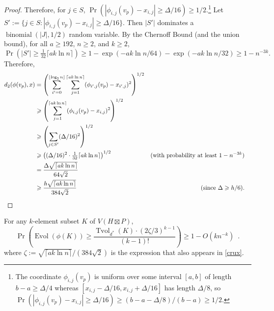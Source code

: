 \documentclass{patmorin}
\renewcommand{\ge}{\geqslant}
\DeclareMathOperator{\evol}{Evol}
\DeclareMathOperator{\tvol}{Tvol}
\begin{document}
\begin{proof}
  Therefore, for $j\in S$, $\Pr(|\phi_{i,j}(v_p)-x_{i,j}|\ge \Delta/16)\ge 1/2$.\footnote{The coordinate $\phi_{i,j}(v_p)$ is uniform over some interval $[a,b]$ of length $b-a\ge \Delta/4$ whereas $[x_{i,j}-\Delta/16,x_{i,j}+\Delta/16]$ has length $\Delta/8$, so $\Pr(|\phi_{i,j}(v_p)-x_{i,j}|\ge \Delta/16)\ge (b-a-\Delta/8)/(b-a)\ge 1/2$.}
  Let $S':=\{j\in S:  |\phi_{i,j}(v_p)-x_{i,j}|\ge \Delta/16\}$.  Then $|S'|$ dominates a $\operatorname{binomial}(|J|,1/2)$ random variable.  By the Chernoff Bound (and the union bound), for all $a\ge 192$, $n\ge 2$, and $k\ge 2$,
  \[
    \Pr(|S'|\ge \tfrac{1}{32}\lceil a k\ln n\rceil)\ge 1-\exp(-ak\ln n/64)-\exp(-ak\ln n/32)\ge 1-n^{-3k}.
  \]
  Therefore,
  \begin{align*}
    d_2(\phi(v_p),x)
    & = \left(\sum_{i'=0}^{\lfloor\log_2 n\rfloor}\sum_{j=1}^{\lceil ak\ln  n\rceil}(\phi_{i',j}(v_p)-x_{i',j})^2\right)^{1/2} \\
    & \ge \left(\sum_{j=1}^{\lceil ak\ln  n\rceil}(\phi_{i,j}(v_p)-x_{i,j})^2\right)^{1/2} \\
    & \ge \left(\sum_{j\in S'}(\Delta/16)^2\right)^{1/2} \\
    & \ge \left((\Delta/16)^2\cdot \tfrac{1}{32}\lceil ak\ln  n\rceil\right)^{1/2}
      & \text{(with probability at least $1-n^{-3k}$)} \\
    & = \frac{\Delta\sqrt{\lceil ak\ln n\rceil}}{64\sqrt{2}} \\
    & \ge \frac{h\sqrt{\lceil ak\ln n\rceil}}{384\sqrt{2}}
     & \text{(since $\Delta\ge h/6$)}. &
    \qedhere
  \end{align*}
\end{proof}

\begin{lem}\label{volume_preserver}
  For any $k$-element subset $K$ of $V(H\boxtimes P)$,
  \[
    \Pr\left(\evol(\phi(K)) \ge \frac{\tvol_{d^*}(K)\cdot(2\zeta/3)^{k-1}}{(k-1)!}\right) \ge 1- O(kn^{-k}) \enspace .
  \]
  where $\zeta:=\sqrt{\lceil ak\ln n\rceil}/(384\sqrt{2})$ is the expression that also appears in \cref{crux}.
\end{lem}
\end{document}
